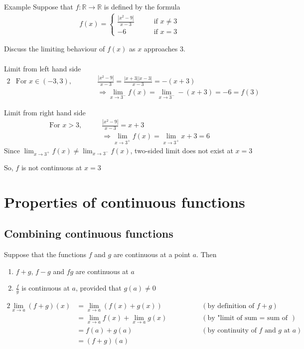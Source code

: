 \documentclass{report}
\begin{document}
			\begin{question}{Example}
				Suppose that $f: \mathbb{R} \rightarrow \mathbb{R}$ is defined by the formula
				\begin{align*}
					f(x) = \begin{cases}
						\frac{|x^2 - 9|}{x-3} \qquad & \text{if } x \neq 3\\
						-6 &\text{if } x = 3
					\end{cases}
				\end{align*}

				Discuss the limiting behaviour of $f(x)$ as $x$ approaches 3.
				\\
				\\
				Limit from left hand side
				\begin{alignat*}{2}
					& \text{For } x \in (-3,3), \qquad && \frac{|x^2 -9|}{x-3} = \frac{|x+3||x-3|}{x-3} = -(x+3)	\\
					&								  && \Rightarrow \lim_{x\to 3^-} f(x) = \lim_{x\to 3^-} -(x+3) = -6 = f(3)
				\end{alignat*}

				Limit from right hand side
				\begin{align*}
					\text{For } x > 3, & \qquad \frac{|x^2 -9|}{x-3} = x+3	\\
									   & \qquad \Rightarrow \lim_{x\to 3^+} f(x) = \lim_{x\to 3^+} x+3 = 6
				\end{align*}
				Since $\displaystyle\lim_{x\to 3^+} f(x) \neq \lim_{x\to 3^-} f(x)$, two-sided limit does not exist at $x = 3$

				So, $f$ is not continuous at $x = 3$

			\end{question}

\chapter{Properties of continuous functions}

\section{Combining continuous functions}
	
	Suppose that the functions $f$ and $g$ are continuous at a point $a$. Then
	\begin{enumerate}
		\item $f+g$, $f-g$ and $fg$ are continuous at $a$
		\item $\frac{f}{g}$ is continuous at $a$, provided that $g(a) \neq 0$
	\end{enumerate}
	\begin{alignat*}{2}
		\lim_{x\to a} (f+g)(x) &= \lim_{x\to a} (f(x) + g(x)) \qquad \qquad 	&& (\text{by definition of } f+g)	\\
							   &= \lim_{x\to a} f(x) + \lim_{x\to a} g(x) 		&& (\text{by "limit of sum = sum of limits"})	\\
							   &= f(a) + g(a)									&& (\text{by continuity of } f \text{ and } g \text{ at } a)	\\
							   &= (f+g)(a)
	\end{alignat*}
\end{document}

